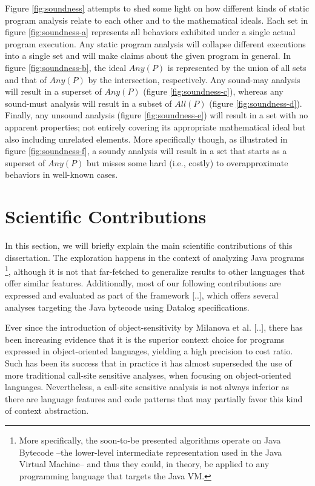 Figure \ref{fig:soundness} attempts to shed some light on how different kinds of static program analysis relate to each other and to the mathematical ideals. Each set in figure \ref{fig:soundness-a} represents all behaviors exhibited under a single actual program execution. Any static program analysis will collapse different executions into a single set and will make claims about the given program in general. In figure \ref{fig:soundness-b}, the ideal $Any(P)$ is represented by the union of all sets and that of $Any(P)$ by the intersection, respectively. Any sound-may analysis will result in a superset of $Any(P)$ (figure \ref{fig:soundness-c}), whereas any sound-must analysis will result in a subset of $All(P)$ (figure \ref{fig:soundness-d}). Finally, any unsound analysis (figure \ref{fig:soundness-e}) will result in a set with no apparent properties; not entirely covering its appropriate mathematical ideal but also including unrelated elements. More specifically though, as illustrated in figure \ref{fig:soundness-f}, a soundy analysis will result in a set that starts as a superset of $Any(P)$ but misses some hard (i.e., costly) to overapproximate behaviors in well-known cases.


\section{Scientific Contributions}

In this section, we will briefly explain the main scientific contributions of this dissertation. The exploration happens in the context of analyzing Java programs \footnote{More specifically, the soon-to-be presented algorithms operate on Java Bytecode --the lower-level intermediate representation used in the Java Virtual Machine-- and thus they could, in theory, be applied to any programming language that targets the Java VM.}, although it is not that far-fetched to generalize results to other languages that offer similar features. Additionally, most of our following contributions are expressed and evaluated as part of the \doop{} framework [..], which offers several analyses targeting the Java bytecode using Datalog specifications.

Ever since the introduction of object-sensitivity by Milanova et al. [..], there has been increasing evidence that it is the superior context choice for programs expressed in object-oriented languages, yielding a high precision to cost ratio. Such has been its success that in practice it has almost superseded the use of more traditional call-site sensitive analyses, when focusing on object-oriented languages. Nevertheless, a call-site sensitive analysis is not always inferior as there are language features and code patterns that may partially favor this kind of context abstraction.

